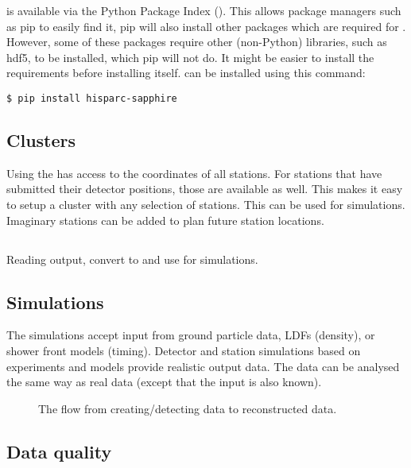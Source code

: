 \sapphire is available via the Python Package Index (\pypi). This allows
package managers such as pip to easily find it, pip will also install
other packages which are required for \sapphire. However, some of these
packages require other (non-Python) libraries, such as hdf5, to be
installed, which pip will not do. It might be easier to install the
requirements before installing \sapphire itself. \sapphire can be
installed using this command:

\begin{verbatim}
$ pip install hisparc-sapphire
\end{verbatim}


\subsection{Clusters}

Using the \api \sapphire has access to the \gps coordinates of all
stations. For stations that have submitted their detector positions,
those are available as well. This makes it easy to setup a cluster with
any selection of \hisparc stations. This can be used for simulations.
Imaginary stations can be added to plan future station locations.


\subsection{\corsika}

Reading \corsika output, convert to \hdf and use for simulations.


\subsection{Simulations}

The simulations accept input from \corsika ground particle data, LDFs
(density), or shower front models (timing). Detector and station simulations based on experiments and models provide realistic output data. The data can
be analysed the same way as real \hisparc data (except that the input is
also known).

\begin{figure}
    \centering
    
    \caption{ The flow from
             creating/detecting data to reconstructed data.}
    \label{fig:sapphire-flow}
\end{figure}


\subsection{Data quality}

